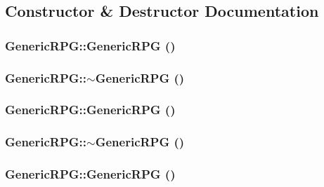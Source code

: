 \subsection{Constructor \& Destructor Documentation}
\hypertarget{classGenericRPG_d909c0fb57cf1b74bacbb0798aa97b29}{
\subsubsection[{GenericRPG}]{\setlength{\rightskip}{0pt plus 5cm}GenericRPG::GenericRPG ()}}
\label{classGenericRPG_d909c0fb57cf1b74bacbb0798aa97b29}


\hypertarget{classGenericRPG_cff866cbb752b594437b5ddca59e0f03}{
\subsubsection[{$\sim$GenericRPG}]{\setlength{\rightskip}{0pt plus 5cm}GenericRPG::$\sim$GenericRPG ()}}
\label{classGenericRPG_cff866cbb752b594437b5ddca59e0f03}


\hypertarget{classGenericRPG_d909c0fb57cf1b74bacbb0798aa97b29}{
\subsubsection[{GenericRPG}]{\setlength{\rightskip}{0pt plus 5cm}GenericRPG::GenericRPG ()}}
\label{classGenericRPG_d909c0fb57cf1b74bacbb0798aa97b29}


\hypertarget{classGenericRPG_cff866cbb752b594437b5ddca59e0f03}{
\subsubsection[{$\sim$GenericRPG}]{\setlength{\rightskip}{0pt plus 5cm}GenericRPG::$\sim$GenericRPG ()}}
\label{classGenericRPG_cff866cbb752b594437b5ddca59e0f03}


\hypertarget{classGenericRPG_d909c0fb57cf1b74bacbb0798aa97b29}{
\subsubsection[{GenericRPG}]{\setlength{\rightskip}{0pt plus 5cm}GenericRPG::GenericRPG ()}}
\label{classGenericRPG_d909c0fb57cf1b74bacbb0798aa97b29}


